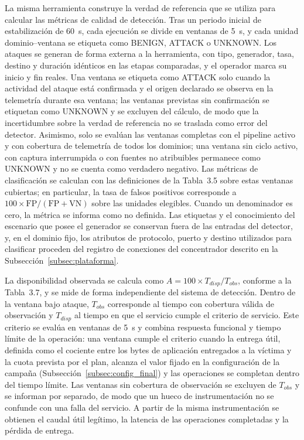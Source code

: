 La misma herramienta construye la verdad de referencia que se utiliza para calcular las métricas de calidad de detección. Tras un periodo inicial de estabilización de 60~s, cada ejecución se divide en ventanas de 5~s, y cada unidad dominio--ventana se etiqueta como BENIGN, ATTACK o UNKNOWN. Los ataques se generan de forma externa a la herramienta, con tipo, generador, tasa, destino y duración idénticos en las etapas comparadas, y el operador marca su inicio y fin reales. Una ventana se etiqueta como ATTACK solo cuando la actividad del ataque está confirmada y el origen declarado se observa en la telemetría durante esa ventana; las ventanas previstas sin confirmación se etiquetan como UNKNOWN y se excluyen del cálculo, de modo que la incertidumbre sobre la verdad de referencia no se traslada como error del detector. Asimismo, solo se evalúan las ventanas completas con el pipeline activo y con cobertura de telemetría de todos los dominios; una ventana sin ciclo activo, con captura interrumpida o con fuentes no atribuibles permanece como UNKNOWN y no se cuenta como verdadero negativo. Las métricas de clasificación se calculan con las definiciones de la Tabla~3.5 sobre estas ventanas cubiertas; en particular, la tasa de falsos positivos corresponde a $100 \times \mathrm{FP}/(\mathrm{FP}+\mathrm{VN})$ sobre las unidades elegibles. Cuando un denominador es cero, la métrica se informa como no definida. Las etiquetas y el conocimiento del escenario que posee el generador se conservan fuera de las entradas del detector, y, en el dominio fijo, los atributos de protocolo, puerto y destino utilizados para clasificar proceden del registro de conexiones del concentrador descrito en la Subsección~\ref{subsec:plataforma}.

La disponibilidad observada se calcula como $A = 100 \times T_{disp}/T_{obs}$, conforme a la Tabla~3.7, y se mide de forma independiente del sistema de detección. Dentro de la ventana bajo ataque, $T_{obs}$ corresponde al tiempo con cobertura válida de observación y $T_{disp}$ al tiempo en que el servicio cumple el criterio de servicio. Este criterio se evalúa en ventanas de 5~s y combina respuesta funcional y tiempo límite de la operación: una ventana cumple el criterio cuando la entrega útil, definida como el cociente entre los bytes de aplicación entregados a la víctima y la cuota prevista por el plan, alcanza el valor fijado en la configuración de la campaña (Subsección~\ref{subsec:config_final}) y las operaciones se completan dentro del tiempo límite. Las ventanas sin cobertura de observación se excluyen de $T_{obs}$ y se informan por separado, de modo que un hueco de instrumentación no se confunde con una falla del servicio. A partir de la misma instrumentación se obtienen el caudal útil legítimo, la latencia de las operaciones completadas y la pérdida de entrega.

